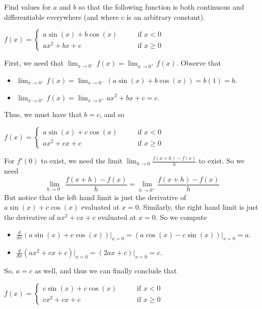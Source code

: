 \documentclass[nooutcomes]{ximera}
\renewenvironment{freeResponse}{
\ifhandout\setbox0\vbox\bgroup\else
\begin{trivlist}\item[\hskip \labelsep\bfseries Solution:\hspace{2ex}]
\fi}
{\ifhandout\egroup\else
\end{trivlist}
\fi}
\newcommand{\ddx}{\frac{d}{dx}}
\begin{document}
\begin{problem}
Find values for $a$ and $b$ so that the following function is both continuous and differentiable everywhere (and where $c$ is an arbitrary constant).

$f(x) =   \left\{ \begin{array}{cl}
	a \sin(x) + b \cos(x)		 	&	\qquad \text{if } x < 0					\\
	ax^2 + bx + c   				&	\qquad \text{if } x \geq 0	 \end{array} \right.  $
		\begin{freeResponse}
		First, we need that $\lim_{x \to 0^-} f(x) = \lim_{x \to 0^+} f(x)$.  Observe that
		
		\begin{itemize}
		
		\item $\lim_{x \to 0^-} f(x) 
		= \lim_{x \to 0^-} (a\sin(x) + b\cos(x))
		= b(1) = b$.
		
		\item  $ \lim_{x \to 0^+} f(x)
		= \lim_{x \to 0^+} ax^2 + bx + c 
		= c$.
		
		\end{itemize}
		
		Thus, we must have that $b = c$, and so 
		
		$f(x) =   \left\{ \begin{array}{cl}
			a \sin(x) + c \cos(x)		 	&	\qquad \text{if } x < 0					\\
			ax^2 + cx + c   				&	\qquad \text{if } x \geq 0	 \end{array} \right.  $
			
		For $f'(0)$ to exist, we need the limit $\lim_{h \to 0} \frac{f(x+h) - f(x)}{h}$ to exist.  So we need 
		$$ \lim_{h \to 0^-} \frac{f(x+h) - f(x)}{h} = \lim_{h \to 0^+} \frac{f(x+h) - f(x)}{h} $$
		But notice that the left hand limit is just the derivative of $a\sin(x) + c\cos(x)$ evaluated at $x=0$.  Similarly, the right hand limit is just the derivative of $ax^2 + cx + c$ evaluated at $x=0$.  So we compute
		
		\begin{itemize}
		
		\item $\ddx \left( a\sin(x) + c\cos(x) \right)\bigg|_{x=0}
			= \left( a\cos(x) - c\sin(x) \right)\bigg|_{x=0}
			= a$.
		
		\item $\ddx \left( ax^2 + cx + c \right)\bigg|_{x=0}
			=\left( 2ax + c \right)\bigg|_{x=0}
			= c$.
		
		\end{itemize}
		
		So, $a = c$ as well, and thus we can finally conclude that
		
		$f(x) =   \left\{ \begin{array}{cl}
			c \sin(x) + c \cos(x)		 	&	\qquad \text{if } x < 0					\\
			cx^2 + cx + c   				&	\qquad \text{if } x \geq 0	 \end{array} \right.  $
		\end{freeResponse}
\end{problem}
\end{document}
